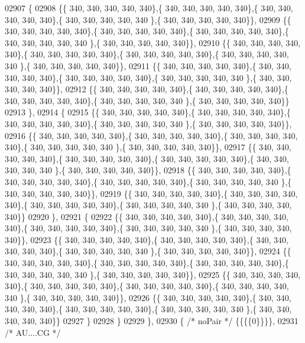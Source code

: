 \begin{DoxyCode}
02907 \{
02908 \{\{ 340, 340, 340, 340, 340\},\{ 340, 340, 340, 340, 340\},\{ 340, 340, 340, 340, 340\},\{ 340, 340, 340, 340, 340
      \},\{ 340, 340, 340, 340, 340\}\},
02909 \{\{ 340, 340, 340, 340, 340\},\{ 340, 340, 340, 340, 340\},\{ 340, 340, 340, 340, 340\},\{ 340, 340, 340, 340, 340
      \},\{ 340, 340, 340, 340, 340\}\},
02910 \{\{ 340, 340, 340, 340, 340\},\{ 340, 340, 340, 340, 340\},\{ 340, 340, 340, 340, 340\},\{ 340, 340, 340, 340, 340
      \},\{ 340, 340, 340, 340, 340\}\},
02911 \{\{ 340, 340, 340, 340, 340\},\{ 340, 340, 340, 340, 340\},\{ 340, 340, 340, 340, 340\},\{ 340, 340, 340, 340, 340
      \},\{ 340, 340, 340, 340, 340\}\},
02912 \{\{ 340, 340, 340, 340, 340\},\{ 340, 340, 340, 340, 340\},\{ 340, 340, 340, 340, 340\},\{ 340, 340, 340, 340, 340
      \},\{ 340, 340, 340, 340, 340\}\}
02913 \},
02914 \{
02915 \{\{ 340, 340, 340, 340, 340\},\{ 340, 340, 340, 340, 340\},\{ 340, 340, 340, 340, 340\},\{ 340, 340, 340, 340, 340
      \},\{ 340, 340, 340, 340, 340\}\},
02916 \{\{ 340, 340, 340, 340, 340\},\{ 340, 340, 340, 340, 340\},\{ 340, 340, 340, 340, 340\},\{ 340, 340, 340, 340, 340
      \},\{ 340, 340, 340, 340, 340\}\},
02917 \{\{ 340, 340, 340, 340, 340\},\{ 340, 340, 340, 340, 340\},\{ 340, 340, 340, 340, 340\},\{ 340, 340, 340, 340, 340
      \},\{ 340, 340, 340, 340, 340\}\},
02918 \{\{ 340, 340, 340, 340, 340\},\{ 340, 340, 340, 340, 340\},\{ 340, 340, 340, 340, 340\},\{ 340, 340, 340, 340, 340
      \},\{ 340, 340, 340, 340, 340\}\},
02919 \{\{ 340, 340, 340, 340, 340\},\{ 340, 340, 340, 340, 340\},\{ 340, 340, 340, 340, 340\},\{ 340, 340, 340, 340, 340
      \},\{ 340, 340, 340, 340, 340\}\}
02920 \},
02921 \{
02922 \{\{ 340, 340, 340, 340, 340\},\{ 340, 340, 340, 340, 340\},\{ 340, 340, 340, 340, 340\},\{ 340, 340, 340, 340, 340
      \},\{ 340, 340, 340, 340, 340\}\},
02923 \{\{ 340, 340, 340, 340, 340\},\{ 340, 340, 340, 340, 340\},\{ 340, 340, 340, 340, 340\},\{ 340, 340, 340, 340, 340
      \},\{ 340, 340, 340, 340, 340\}\},
02924 \{\{ 340, 340, 340, 340, 340\},\{ 340, 340, 340, 340, 340\},\{ 340, 340, 340, 340, 340\},\{ 340, 340, 340, 340, 340
      \},\{ 340, 340, 340, 340, 340\}\},
02925 \{\{ 340, 340, 340, 340, 340\},\{ 340, 340, 340, 340, 340\},\{ 340, 340, 340, 340, 340\},\{ 340, 340, 340, 340, 340
      \},\{ 340, 340, 340, 340, 340\}\},
02926 \{\{ 340, 340, 340, 340, 340\},\{ 340, 340, 340, 340, 340\},\{ 340, 340, 340, 340, 340\},\{ 340, 340, 340, 340, 340
      \},\{ 340, 340, 340, 340, 340\}\}
02927 \}
02928 \}
02929 \},
02930 \{ \textcolor{comment}{/* noPair */} \{\{\{\{0\}\}\}\},
02931 \textcolor{comment}{/* AU....CG */}

\end{DoxyCode}
